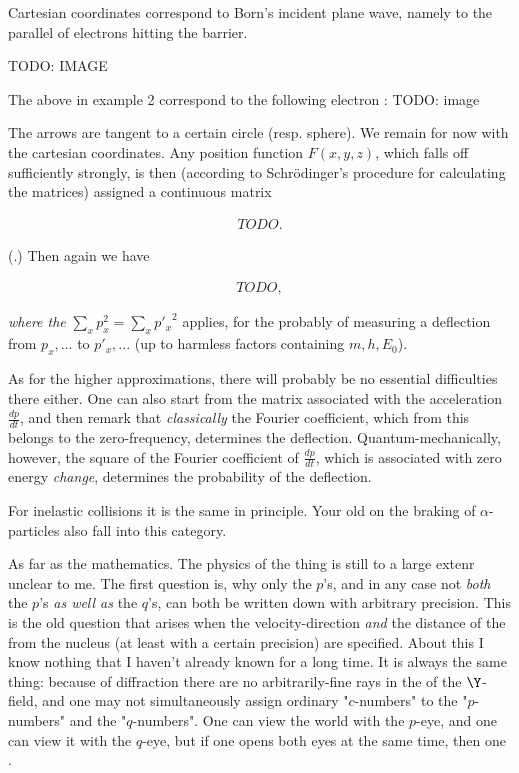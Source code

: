 \documentclass{article}
\newcommand{\uequ}[1]{
\begin{align*}
#1
\end{align*}
}
\newcommand{\sumX}[1]{\underset{#1}{\sum}}
\begin{document}
Cartesian coordinates correspond to Born's incident plane wave, namely to the parallel  of electrons hitting the barrier.

TODO: IMAGE

The above  in example 2 correspond to the following electron :
TODO: image

The arrows are tangent to a certain circle (resp. sphere). We remain for now with the cartesian coordinates. Any position function $F(x,y,z)$, which falls off sufficiently strongly, is then (according to Schr\"odinger's procedure for calculating the matrices) assigned a continuous matrix
\uequ{
TODO.
}
(.) Then again we have
\uequ{
TODO,
}
\textit{where the } $\sumX{x}{
p_x^2} = \sumX{x}{{p'_x}^2}$ applies, for the probably of measuring a deflection from $p_x,...$ to $p'_x,...$ (up to harmless factors containing $m,h,E_0$).

As for the higher approximations, there will probably be no essential difficulties there either. One can also start from the matrix associated with the acceleration $\frac{dp}{dt}$, and then remark that \textit{classically} the Fourier coefficient, which from this belongs to the zero-frequency,
determines the deflection. Quantum-mechanically, however, the square of the Fourier coefficient of $\frac{dp}{dt}$, which is associated with zero energy \textit{change}, determines the probability of the deflection.

For inelastic collisions it is the same in principle. Your old  on the braking of $\alpha$-particles also fall into this category.

As far as the mathematics. The physics of the thing is still to a large extenr unclear to me. The first question is, why only the $p$'s, and in any case not \textit{both} the $p$'s \textit{as well as} the $q$'s, can both be written down with arbitrary precision. This is the old question that arises when the velocity-direction \textit{and} the distance of the  from the nucleus (at least with a certain precision) are specified. About this I know nothing that I haven't already known for a long time. It is always the same thing: because of diffraction there are no arbitrarily-fine rays in the  of the $\Y$-field, and one may not simultaneously assign ordinary "$c$-numbers" to the "$p$-numbers" and the "$q$-numbers". One can view the world with the $p$-eye, and one can view it with the $q$-eye, but if one opens both eyes at the same time, then one .
\end{document}
